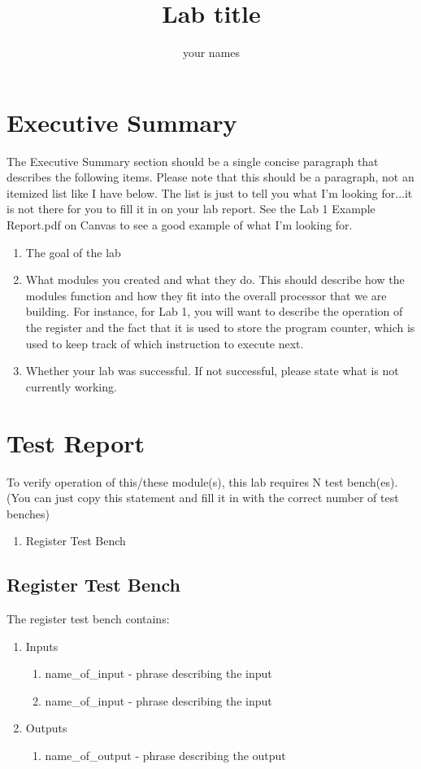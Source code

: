 \documentclass{article}
\author{your names}
\title{Lab title}
\begin{document}
\maketitle

\section{Executive Summary}
The Executive Summary section should be a single concise paragraph that describes the following items.  Please note that this should be a paragraph, not an itemized list like I have below.  The list is just to tell you what I'm looking for...it is not there for you to fill it in on your lab report.  See the Lab 1 Example Report.pdf on Canvas to see a good example of what I'm looking for.
\begin{enumerate}
	\item The goal of the lab
	\item What modules you created and what they do.  This should describe how the modules function and how they fit into the overall processor that we are building.  For instance, for Lab 1, you will want to describe the operation of the register and the fact that it is used to store the program counter, which is used to keep track of which instruction to execute next.
	\item Whether your lab was successful.  If not successful, please state what is not currently working.
\end{enumerate}	

\section{Test Report}
To verify operation of this/these module(s), this lab requires N test bench(es).  (You can just copy this statement and fill it in with the correct number of test benches)
\begin{enumerate}
	\item Register Test Bench
\end{enumerate}

\subsection{Register Test Bench}
The register test bench contains:
\begin{enumerate}
	\item Inputs
	\begin{enumerate}
		\item name\_of\_input - phrase describing the input
		\item name\_of\_input - phrase describing the input
	\end{enumerate}	
	\item Outputs
	\begin{enumerate}	
		\item name\_of\_output - phrase describing the output
	\end{enumerate}
\end{enumerate} 
\end{document}
